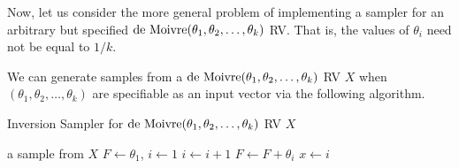 Now, let us consider the more general problem of implementing a sampler for an arbitrary but specified $\mbox{{\rm de~Moivre}}(\theta_1,\theta_2,\ldots,\theta_k)$ RV.  That is, the values of $\theta_i$ need not be equal to $1/k$.
\begin{simulation}\label{SIM:deMoivre}
We can generate samples from a $\mbox{{\rm de~Moivre}}(\theta_1,\theta_2,\ldots,\theta_k)$ RV $X$ when $(\theta_1,\theta_2,\ldots,\theta_k)$ are specifiable as an input vector via the following algorithm.

\begin{algorithm}
\caption{Inversion Sampler for $\mbox{{\rm de~Moivre}}(\theta_1,\theta_2,\ldots,\theta_k)$ RV $X$}
\label{A:SimdeMoivre}
\begin{algorithmic}[1]
 a sample from $X$
  $F \gets \theta_1$, $i \gets 1$
\STATE $i \gets i+1$
\STATE $F \gets F+\theta_{i}$
\ENDWHILE
{} $x \gets i$
\end{algorithmic}
\end{algorithm}


\end{simulation}
